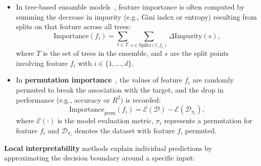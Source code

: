 \begin{itemize}
    \item In tree-based ensamble models~\cite{feature_importance}, feature importance is
          often computed by summing the decrease in impurity (e.g., Gini index or
          entropy) resulting from splits on that feature across all trees: \begin{equation} \text{Importance}(f_i) =
              \sum_{t \in T} \sum_{s \in \text{Splits}(t, f_i)} \Delta \text{Impurity}(s),
          \end{equation}
          where $T$ is the set of trees in the ensemble, and $s$ are the split points
          involving feature $f_i$ with $i \in \{ 1, \ldots, d\}$.

    \item In \textbf{permutation importance}~\cite{permutation_importance}, the values of
          feature $f_i$ are randomly permuted to break the association with the target,
          and the drop in performance (e.g., accuracy or $R^2$) is recorded:
          \begin{equation} \text{Importance}_{\text{perm}}(f_i) =
              \mathcal{E}(\mathcal{D}) - \mathcal{E}(\mathcal{D}_{\pi_i}),
          \end{equation}
          where $\mathcal{E}(\cdot)$ is the model evaluation metric, $\pi_i$ represents a
          permutation for feature $f_i$ and
          $\mathcal{D}_{\pi_i}$ denotes the dataset with feature $f_i$ permuted.
\end{itemize}

\textbf{Local interpretability} methods explain individual predictions by approximating
the decision boundary around a specific input:


